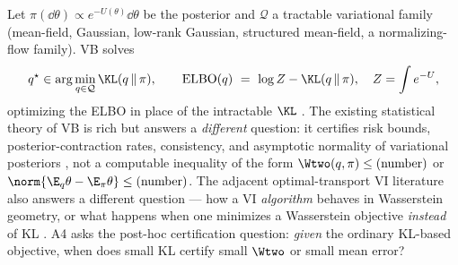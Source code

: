 \documentclass[../../main.tex]{subfiles}
\begin{document}
Let $\pi(\dd\theta)\propto e^{-U(\theta)}\dd\theta$ be the posterior and $\mathcal Q$ a tractable
variational family (mean-field, Gaussian, low-rank Gaussian, structured mean-field, a
normalizing-flow family). VB solves
\[
  q^\star\in\arg\min_{q\in\mathcal Q}\KL(q\,\|\,\pi),
  \qquad
  \mathrm{ELBO}(q)\ =\ \log Z-\KL(q\,\|\,\pi),\quad Z=\int e^{-U},
\]
optimizing the ELBO in place of the intractable $\KL$ \cite{BleiKucukelbirMcAuliffe2017}. The
existing statistical theory of VB is rich but answers a \emph{different} question: it certifies
risk bounds, posterior-contraction rates, consistency, and asymptotic normality of variational
posteriors \cite{WangBlei2019,ZhangGao2020,YangPatiBhattacharya2020,RaySzabo2020}, not a
computable inequality of the form $\Wtwo(q,\pi)\le(\text{number})$ or
$\norm{\E_q\theta-\E_\pi\theta}\le(\text{number})$. The adjacent optimal-transport VI literature
also answers a different question --- how a VI \emph{algorithm} behaves in Wasserstein geometry,
or what happens when one minimizes a Wasserstein objective \emph{instead} of KL
\cite{AmbrogioniEtAl2018,YiLiu2023,LambertEtAl2022,ArneseLacker2024,JiangChewiPooladian2023}.
A4 asks the post-hoc certification question: \emph{given} the ordinary KL-based objective, when
does small KL certify small $\Wtwo$ or small mean error?
\end{document}
